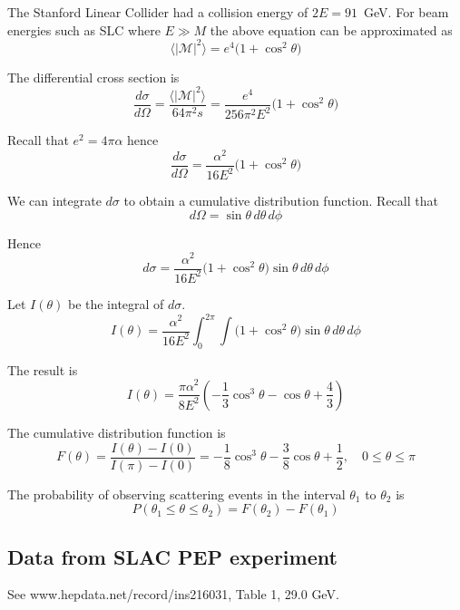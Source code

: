 \documentclass[12pt]{article}
\begin{document}
\noindent
The Stanford Linear Collider
had a collision energy of $2E=91$~GeV.
For beam energies such as SLC where $E\gg M$ the above equation can be approximated as
$$
\langle|\mathcal{M}|^2\rangle=e^4\big(1+\cos^2\theta\big)
$$

\noindent
The differential cross section is
$$
\frac{d\sigma}{d\Omega}
=\frac{\langle|\mathcal{M}|^2\rangle}{64\pi^2s}
=\frac{e^4}{256\pi^2E^2}\big(1+\cos^2\theta\big)
$$

\noindent
Recall that $e^2=4\pi\alpha$ hence
\begin{equation*}
\frac{d\sigma}{d\Omega}=\frac{\alpha^2}{16E^2}\big(1+\cos^2\theta\big)
\end{equation*}

\noindent
We can integrate $d\sigma$ to obtain a cumulative distribution function.
Recall that
\begin{equation*}
d\Omega=\sin\theta\,d\theta\,d\phi
\end{equation*}

Hence
\begin{equation*}
d\sigma=\frac{\alpha^2}{16E^2}\big(1+\cos^2\theta)\sin\theta\,d\theta\,d\phi
\end{equation*}

Let $I(\theta)$ be the integral of $d\sigma$.
\begin{equation*}
I(\theta)=\frac{\alpha^2}{16E^2}\int_0^{2\pi}\int\big(1+\cos^2\theta)\sin\theta\,d\theta\,d\phi
\end{equation*}

\noindent
The result is
\begin{equation*}
I(\theta)=\frac{\pi\alpha^2}{8E^2}
\left(-\frac{1}{3}\cos^3\theta-\cos\theta+\frac{4}{3}\right)
\end{equation*}

\noindent
The cumulative distribution function is
\begin{equation*}
F(\theta)=\frac{I(\theta)-I(0)}{I(\pi)-I(0)}
=-\frac{1}{8}\cos^3\theta-\frac{3}{8}\cos\theta+\frac{1}{2},
\quad
0\le\theta\le\pi
\end{equation*}

The probability of observing scattering events in the interval
$\theta_1$ to $\theta_2$ is
\begin{equation*}
P(\theta_1\le\theta\le\theta_2)=F(\theta_2)-F(\theta_1)
\end{equation*}

\subsection*{Data from SLAC PEP experiment}
See www.hepdata.net/record/ins216031, Table 1, 29.0 GeV.
\end{document}
